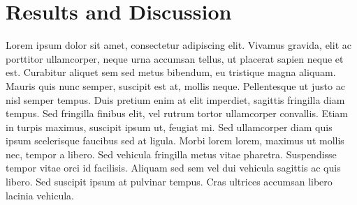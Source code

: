 \section{Results and Discussion}
Lorem ipsum dolor sit amet, consectetur adipiscing elit. Vivamus gravida, elit ac porttitor ullamcorper, neque urna accumsan tellus, ut placerat sapien neque et est. Curabitur aliquet sem sed metus bibendum, eu tristique magna aliquam. Mauris quis nunc semper, suscipit est at, mollis neque. Pellentesque ut justo ac nisl semper tempus. Duis pretium enim at elit imperdiet, sagittis fringilla diam tempus. Sed fringilla finibus elit, vel rutrum tortor ullamcorper convallis. Etiam in turpis maximus, suscipit ipsum ut, feugiat mi. Sed ullamcorper diam quis ipsum scelerisque faucibus sed at ligula. Morbi lorem lorem, maximus ut mollis nec, tempor a libero. Sed vehicula fringilla metus vitae pharetra. Suspendisse tempor vitae orci id facilisis. Aliquam sed sem vel dui vehicula sagittis ac quis libero. Sed suscipit ipsum at pulvinar tempus. Cras ultrices accumsan libero lacinia vehicula.